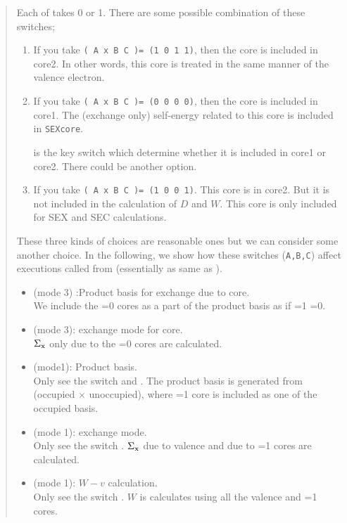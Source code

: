 {\begin{quote}
Each of  takes 0 or 1.
There are some possible combination of these switches;
\begin{enumerate}
\item 
If you take 
{\tt ( A  x   B    C )= (1 0 1 1)},
then the core is included in core2. In other words, this core is treated in the same 
manner of the valence electron.

\item 
If you take
{\tt ( A  x   B    C )= (0 0 0 0)},
then the core is included in core1.
The (exchange only) self-energy related to this core is included in {\tt SEXcore}.

 is the key switch which determine whether it is included in core1 or core2.
There could be another option.

\item 
If you take
{\tt ( A  x   B    C )= (1 0 0 1)}.
This core is in core2. But it is not included in the calculation of $D$ and $W$.
This core is only included for SEX and SEC calculations.
\end{enumerate}
These three kinds of choices are reasonable ones but we can consider some another choice.
In the following, we show how these switches (\verb#A,B,C#) affect executions called from 
 (essentially as same as ).
\begin{itemize}
\item 
{}(mode 3) :Product basis for exchange due to core.\\
We include the =0 cores as a part of
the product basis as if =1 =0.

\item 
{}(mode 3): exchange mode for core.\\
$\Sigma_{\rm x}$ only due to the =0 cores are calculated.

\item 
{} (mode1): Product basis.\\
Only see the switch  and .
The product basis is generated from (occupied $\times$ unoccupied), 
where =1 core is included as one of the occupied basis.

\item 
{} (mode 1): exchange mode.\\
Only see the switch .
$\Sigma_{\rm x}$ due to valence and due to =1 cores
are calculated.

\item 
{} (mode 1): $W-v$ calculation.\\
Only see the switch .
$W$ is calculates using all the valence and =1 cores.


\end{itemize}
\end{quote}}
